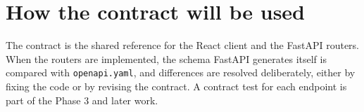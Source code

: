 \section{How the contract will be used}
The contract is the shared reference for the React client and the FastAPI routers. When the routers are implemented, the schema FastAPI generates itself is compared with \texttt{openapi.yaml}, and differences are resolved deliberately, either by fixing the code or by revising the contract. A contract test for each endpoint is part of the Phase 3 and later work.

